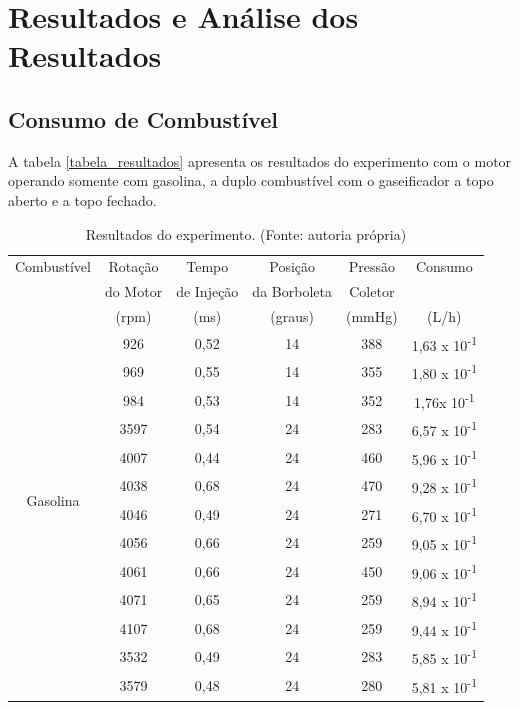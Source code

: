 \chapter[Resultados e Análise dos Resultados]{Resultados e Análise dos Resultados}

\section{Consumo de Combustível}
A tabela \ref{tabela_resultados} apresenta os resultados do experimento com o motor operando somente com gasolina, a duplo combustível com o gaseificador a topo aberto e a topo fechado. 

\begin{table}[h]
	\centering
	\caption{Resultados do experimento. (Fonte: autoria própria)}
	\begin{tabular}{|c|c|c|c|c|c|}
		\hline
		Combustível & Rotação & Tempo & Posição & Pressão & Consumo	\\
		& do Motor & de Injeção & da Borboleta & Coletor & \\
		& (rpm) & (ms) & (graus) & (mmHg) & (L/h)\\
		\hline
		\multirow{12}{4.5cm}{Gasolina}
		& 926 & 0,52 & 14 & 388 & 1,63 x 10\textsuperscript{-1}\\
		& 969 & 0,55 & 14 & 355 & 1,80 x 10\textsuperscript{-1}\\
		& 984 & 0,53 & 14 & 352 & 1,76x 10\textsuperscript{-1}\\
		& 3597 & 0,54 & 24 & 283 & 6,57 x 10\textsuperscript{-1} \\
		& 4007 & 0,44 & 24 & 460 & 5,96 x 10\textsuperscript{-1}\\
		& 4038 & 0,68 & 24 & 470 & 9,28 x 10\textsuperscript{-1}\\
		& 4046 & 0,49 & 24 & 271 & 6,70 x 10\textsuperscript{-1}\\
		& 4056 & 0,66 & 24 & 259 & 9,05 x 10\textsuperscript{-1}\\
		& 4061 & 0,66 & 24 & 450 & 9,06 x 10\textsuperscript{-1}\\
		& 4071 & 0,65 & 24 & 259 & 8,94 x 10\textsuperscript{-1}\\
		& 4107 & 0,68 & 24 & 259 & 9,44 x 10\textsuperscript{-1}\\
		\hline
		\multirow{12}{4.5cm}{Gasolina + syngas (Topo aberto)}
		& 3532 & 0,49 & 24 & 283 & 5,85 x 10\textsuperscript{-1}\\
		& 3579 & 0,48 & 24 & 280 & 5,81 x 10\textsuperscript{-1}\\

\end{tabular}
\end{table}
